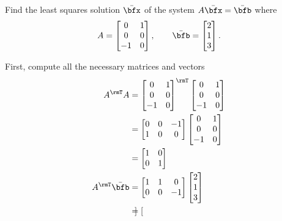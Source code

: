 \begin{questions}
  \question[6] Find the least squares solution $\bar\bfx$ of the system
  $A\bar{\bfx}=\bar{\bfb}$ where
  \[
    A=
    \begin{bmatrix}
      0&1\\
      0&0\\
      -1&0
    \end{bmatrix},
    \qquad
    \bar{\bfb}=
    \begin{bmatrix}
      2\\1\\3
    \end{bmatrix}.
  \]
  \begin{solution}
    First, compute all the necessary matrices and vectors
    \begin{align*}
      A^\rmT A
      &=\begin{bmatrix}
        0&1\\
        0&0\\
        -1&0
      \end{bmatrix}^\rmT
      \begin{bmatrix}
        0&1\\
        0&0\\
        -1&0
      \end{bmatrix}
      \\
      &=\begin{bmatrix}
        0&0&-1\\
        1&0&0
      \end{bmatrix}
      \begin{bmatrix}
        0&1\\
        0&0\\
        -1&0
      \end{bmatrix}
      \\
      &=\begin{bmatrix}
        1&0\\
        0&1
      \end{bmatrix}\\
      A^\rmT\bar\bfb
      &=\begin{bmatrix}
        1&1&0\\
        0&0&-1
        \end{bmatrix}
       \begin{bmatrix}
         2\\1\\3
       \end{bmatrix}\\
      &=\begin{bmatrix}

\end{bmatrix}
\end{align*}
\end{solution}
\end{questions}

